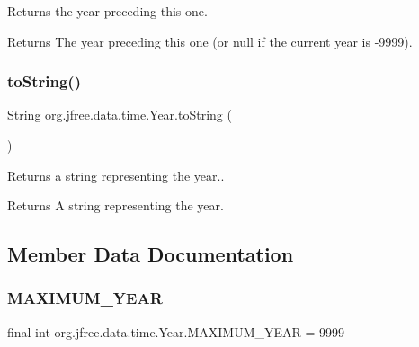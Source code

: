 Returns the year preceding this one.

\begin{DoxyReturn}{Returns}
The year preceding this one (or {\ttfamily null} if the current year is -\/9999). 
\end{DoxyReturn}
\mbox{\label{classorg_1_1jfree_1_1data_1_1time_1_1_year_a1a9282b4a6890c347bfccadef2a68c61}} 
\subsubsection{\texorpdfstring{to\+String()}{toString()}}
{\footnotesize\ttfamily String org.\+jfree.\+data.\+time.\+Year.\+to\+String (\begin{DoxyParamCaption}{ }\end{DoxyParamCaption})}

Returns a string representing the year..

\begin{DoxyReturn}{Returns}
A string representing the year. 
\end{DoxyReturn}


\subsection{Member Data Documentation}
\mbox{\label{classorg_1_1jfree_1_1data_1_1time_1_1_year_abb76bd6ebcbd24a4b797c43d78ebcfa7}} 
\subsubsection{\texorpdfstring{M\+A\+X\+I\+M\+U\+M\+\_\+\+Y\+E\+AR}{MAXIMUM\_YEAR}}
{\footnotesize\ttfamily final int org.\+jfree.\+data.\+time.\+Year.\+M\+A\+X\+I\+M\+U\+M\+\_\+\+Y\+E\+AR = 9999\hspace{0.3cm}{\ttfamily [static]}}

